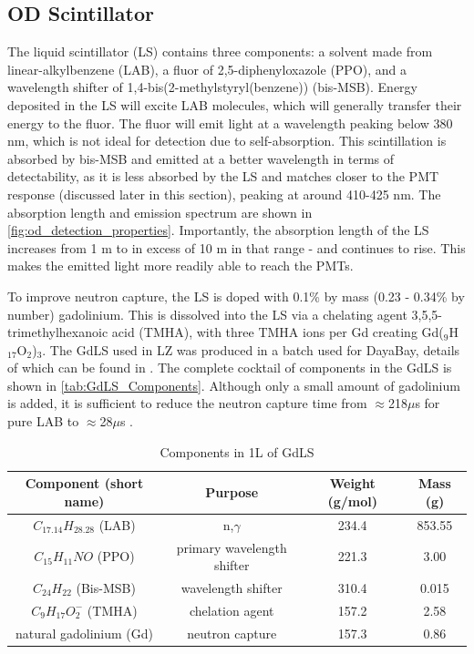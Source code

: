 

\subsection{OD Scintillator}
\par
The liquid scintillator (LS) contains three components: a solvent made from linear-alkylbenzene (LAB), a fluor of 2,5-diphenyloxazole (PPO), and a wavelength shifter of 1,4-bis(2-methylstyryl(benzene)) (bis-MSB).
Energy deposited in the LS will excite LAB molecules, which will generally transfer their energy to the fluor. 
The fluor will emit light at a wavelength peaking below 380 nm, which is not ideal for detection due to self-absorption.
This scintillation is absorbed by bis-MSB and emitted at a better wavelength in terms of detectability, as it is less absorbed by the LS and matches closer to the PMT response (discussed later in this section), peaking at around 410-425 nm.
The absorption length and emission spectrum are shown in \autoref{fig:od_detection_properties}.
Importantly, the absorption length of the LS increases from 1 m to in excess of 10 m in that range - and continues to rise.
This makes the emitted light more readily able to reach the PMTs.



\par
To improve neutron capture, the LS is doped with 0.1\% by mass (0.23 - 0.34\% by number) gadolinium.
This is dissolved into the LS via a chelating agent 3,5,5-trimethylhexanoic acid (TMHA), with three TMHA ions per Gd creating Gd(${}_{9}$H${}_{17}$O${}_{2}$)${}_{3}$.
The GdLS used in LZ was produced in a batch used for DayaBay, details of which can be found in \cite{dayabay_gd_doping_ref}.
The complete cocktail of components in the GdLS is shown in \autoref{tab:GdLS_Components}.
Although only a small amount of gadolinium is added, it is sufficient to reduce the neutron capture time from $\approx$218$\mu$s for pure LAB to $\approx$28$\mu$s \cite{ucsb_gdls_dicebox_simulations_ref}.

\begin{table}
    \centering
    \begin{tabular}{c | c | c | c}
    \hline
    {Component (short name)} & {Purpose} & {Weight (g/mol)} & {Mass (g)} \\ \hline
    $C_{17.14}H_{28.28}$ (LAB) & n,$\gamma$ & 234.4  & 853.55 \\
    $C_{15}H_{11}NO$ (PPO) & primary wavelength shifter & 221.3 & 3.00 \\
    $C_{24}H_{22}$ (Bis-MSB) & wavelength shifter & 310.4 & 0.015 \\
    $C_{9}H_{17}O^{-}_{2}$ (TMHA) & chelation agent & 157.2 & 2.58 \\
    natural gadolinium (Gd) & neutron capture & 157.3 & 0.86 
    \end{tabular}
    \caption{Components in 1L of GdLS}
    \label{tab:GdLS_Components}
\end{table} 


